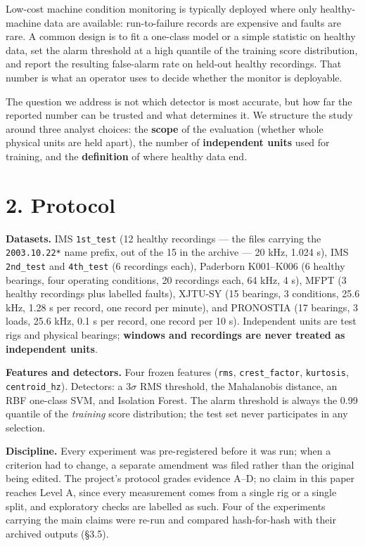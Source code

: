 \documentclass[11pt]{article}
\newcommand{\code}[1]{\texttt{#1}}
\begin{document}
Low-cost machine condition monitoring is typically deployed where only healthy-machine data are available: run-to-failure records are expensive and faults are rare. A common design is to fit a one-class model or a simple statistic on healthy data, set the alarm threshold at a high quantile of the training score distribution, and report the resulting false-alarm rate on held-out healthy recordings. That number is what an operator uses to decide whether the monitor is deployable.

The question we address is not which detector is most accurate, but how far the reported number can be trusted and what determines it. We structure the study around three analyst choices: the \textbf{scope} of the evaluation (whether whole physical units are held apart), the number of \textbf{independent units} used for training, and the \textbf{definition} of where healthy data end.



\section{2. Protocol}

\textbf{Datasets.} IMS \code{1st\_test} (12 healthy recordings --- the files carrying the \code{2003.10.22*} name prefix, out of the 15 in the archive --- 20 kHz, 1.024 s), IMS \code{2nd\_test} and \code{4th\_test} (6 recordings each), Paderborn K001--K006 (6 healthy bearings, four operating conditions, 20 recordings each, 64 kHz, 4 s), MFPT (3 healthy recordings plus labelled faults), XJTU-SY (15 bearings, 3 conditions, 25.6 kHz, 1.28 s per record, one record per minute), and PRONOSTIA (17 bearings, 3 loads, 25.6 kHz, 0.1 s per record, one record per 10 s). Independent units are test rigs and physical bearings; \textbf{windows and recordings are never treated as independent units}.

\textbf{Features and detectors.} Four frozen features (\code{rms}, \code{crest\_factor}, \code{kurtosis}, \code{centroid\_hz}). Detectors: a 3$\sigma$ RMS threshold, the Mahalanobis distance, an RBF one-class SVM, and Isolation Forest. The alarm threshold is always the 0.99 quantile of the \emph{training} score distribution; the test set never participates in any selection.

\textbf{Discipline.} Every experiment was pre-registered before it was run; when a criterion had to change, a separate amendment was filed rather than the original being edited. The project's protocol grades evidence A--D; no claim in this paper reaches Level A, since every measurement comes from a single rig or a single split, and exploratory checks are labelled as such. Four of the experiments carrying the main claims were re-run and compared hash-for-hash with their archived outputs (\S3.5).
\end{document}
